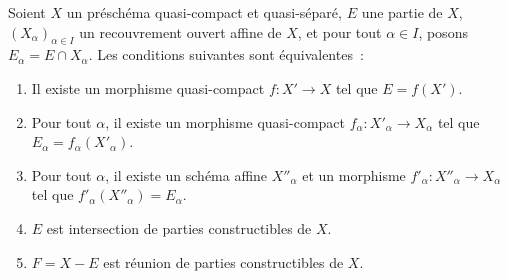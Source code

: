 \begin{proposition}[1.9.3]
\label{IV.1.9.3-fr}
Soient $X$ un préschéma quasi-compact et quasi-séparé, $E$ une partie de $X$,
$(X_\alpha)_{\alpha\in I}$ un recouvrement ouvert affine de $X$, et pour
tout $\alpha\in I$, posons $E_\alpha=E\cap X_\alpha$. Les conditions
suivantes sont équivalentes~:
\begin{enumerate}
  \item[a)] Il existe un morphisme quasi-compact $f:X'\to X$ tel que
  $E=f(X')$.
  \item[a$'$)] Pour tout $\alpha$, il existe un morphisme quasi-compact
  $f_\alpha:X'_\alpha\to X_\alpha$ tel que
  $E_\alpha=f_\alpha(X'_\alpha)$.
  \item[a$''$)] Pour tout $\alpha$, il existe un schéma affine $X''_\alpha$
  et un morphisme $f'_\alpha:X''_\alpha\to X_\alpha$ tel que
  $f'_\alpha(X''_\alpha)=E_\alpha$.
  \item[b)] $E$ est intersection de parties constructibles de $X$.
  \item[b$'$)] $F=X-E$ est réunion de parties constructibles de $X$.
\end{enumerate}
\end{proposition}


